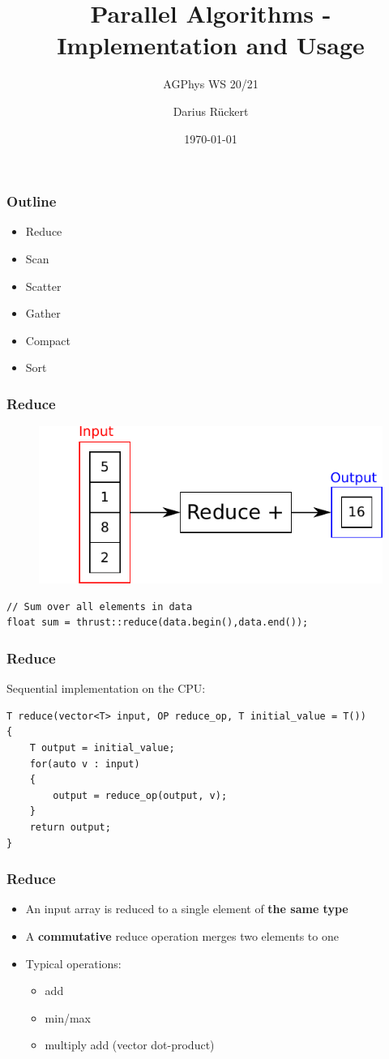 \documentclass[aspectratio=169]{beamer}
\subtitle{AGPhys WS 20/21}
\title{Parallel Algorithms - Implementation and Usage}
\author[Darius Rückert]{Darius Rückert}
\date{\today}
\begin{document}
\frame
{
	\titlepage
}

\frame
{
\frametitle{Outline}
\begin{itemize}
	\item Reduce 
	\item Scan 
	\item Scatter
	\item Gather
	\item Compact
	\item Sort
\end{itemize}
}



\begin{frame}[fragile]
\frametitle{Reduce}
\begin{figure}
	\centering
	\includegraphics[height=0.6\textheight]{o_reduce}
\end{figure}

\begin{lstlisting}
// Sum over all elements in data
float sum = thrust::reduce(data.begin(),data.end());
\end{lstlisting}
\end{frame}



\begin{frame}[fragile]
	\frametitle{Reduce}
	Sequential implementation on the CPU:
\begin{lstlisting}
T reduce(vector<T> input, OP reduce_op, T initial_value = T())
{
	T output = initial_value;
	for(auto v : input)
	{
		output = reduce_op(output, v);
	}
	return output;
}
\end{lstlisting}
\end{frame}

\frame
{	
	\frametitle{Reduce}
	\begin{itemize}
		\item An input array is reduced to a single element of \textbf{the same type}
		\item<2-> A \textbf{commutative} reduce operation merges two elements to one
		\item<2-> Typical operations:
		\begin{itemize}
			\item add
			\item min/max
			\item multiply add (vector dot-product)
		\end{itemize}
	\end{itemize}
}
\end{document}
